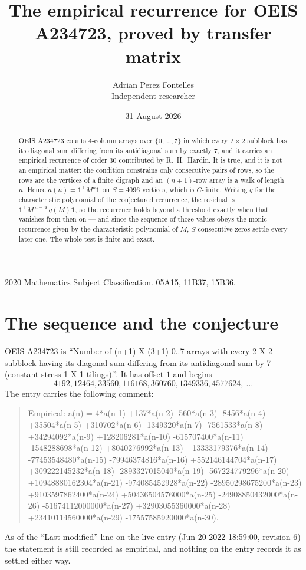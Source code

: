 \documentclass[11pt,a4paper]{article}
\title{The empirical recurrence for OEIS A234723, proved by transfer matrix}
\author{Adrian Perez Fontelles\\ \small Independent researcher}
\date{31 August 2026}
\theoremstyle{plain}
\theoremstyle{definition}
\begin{document}
\maketitle

\begin{abstract}
OEIS A234723 counts $4$-column arrays over $\{0,\dots,7\}$ in which every
$2\times2$ subblock has its diagonal sum differing from its antidiagonal sum by
exactly $7$, and it
carries an empirical recurrence of order $30$ contributed by R.~H.~Hardin. It is true,
and it is not an empirical matter: the condition constrains only consecutive pairs of rows,
so the rows are the vertices of a finite digraph and an $(n+1)$-row array is a walk of
length $n$. Hence $a(n)=\mathbf{1}^{\!\top}M^{n}\mathbf{1}$ on $S=4096$ vertices, which
is $C$-finite. Writing $q$ for the characteristic polynomial of the conjectured recurrence,
the residual is $\mathbf{1}^{\!\top}M^{\,n-30}q(M)\mathbf{1}$, so the recurrence
holds beyond a threshold exactly when that vanishes from then on --- and since the sequence
of those values obeys the monic recurrence given by the characteristic polynomial of $M$,
$S$ consecutive zeros settle every later one. The whole test is finite and exact.
\end{abstract}

\noindent\small 2020 Mathematics Subject Classification. 05A15, 11B37, 15B36.\normalsize

\section{The sequence and the conjecture}

OEIS A234723 is ``Number of (n+1) X (3+1) 0..7 arrays with every 2 X 2 subblock having its diagonal sum differing from its antidiagonal sum by 7 (constant-stress 1 X 1 tilings).''. It has offset
$1$ and begins
\[
4192, 12464, 33560, 116168, 360760, 1349336, 4577624,\ \dots
\]
The entry carries the following comment:
\begin{quote}\small
Empirical: a(n) = 4*a(n-1) +137*a(n-2) -560*a(n-3) -8456*a(n-4) +35504*a(n-5) +310702*a(n-6) -1349320*a(n-7) -7561533*a(n-8) +34294092*a(n-9) +128206281*a(n-10) -615707400*a(n-11) -1548288698*a(n-12) +8040276992*a(n-13) +13333179376*a(n-14) -77453548480*a(n-15) -79946374816*a(n-16) +552146144704*a(n-17) +309222145232*a(n-18) -2893327015040*a(n-19) -567224779296*a(n-20) +10948880162304*a(n-21) -974085452928*a(n-22) -28950298675200*a(n-23) +9103597862400*a(n-24) +50436504576000*a(n-25) -24908850432000*a(n-26) -51674112000000*a(n-27) +32903055360000*a(n-28) +23410114560000*a(n-29) -17557585920000*a(n-30).
\end{quote}
As of the ``Last modified'' line on the live entry (Jun 20 2022 18:59:00, revision 6) the statement is
still recorded as empirical, and nothing on the entry records it as settled either way.
\end{document}
